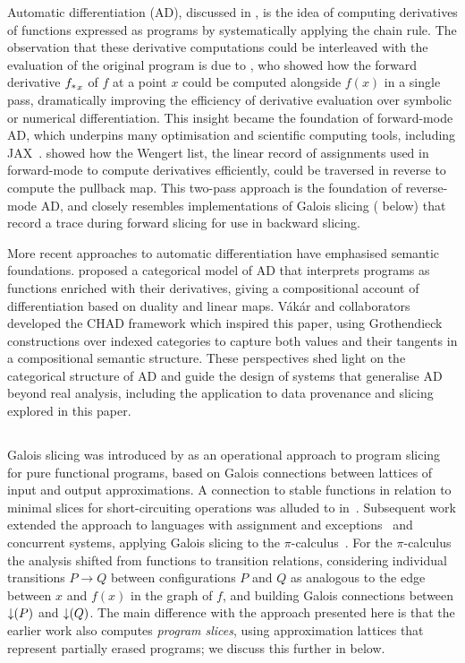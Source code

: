 Automatic differentiation (AD), discussed in , is the idea of computing
derivatives of functions expressed as programs by systematically applying the chain rule. The observation that
these derivative computations could be interleaved with the evaluation of the original program is due to
\citet{linnainmaa76}, who showed how the forward derivative ${f_{*}}_x$ of $f$ at a point $x$ could be
computed alongside $f(x)$ in a single pass, dramatically improving the efficiency of derivative evaluation
over symbolic or numerical differentiation. This insight became the foundation of forward-mode AD, which
underpins many optimisation and scientific computing tools, including JAX~\cite{jax2018github}.
\citet{griewank89} showed how the Wengert list, the linear record of assignments used in forward-mode to
compute derivatives efficiently, could be traversed in reverse to compute the pullback map. This two-pass
approach is the foundation of reverse-mode AD, and closely resembles implementations of Galois slicing
( below) that record a trace during forward slicing for use in backward
slicing.

More recent approaches to automatic differentiation have emphasised semantic foundations. \citet{elliott18}
proposed a categorical model of AD that interprets programs as functions enriched with their derivatives,
giving a compositional account of differentiation based on duality and linear maps. Vákár and
collaborators~\cite{vákár22,nunes2023} developed the CHAD framework which inspired this paper, using
Grothendieck constructions over indexed categories to capture both values and their tangents in a
compositional semantic structure. These perspectives shed light on the categorical structure of AD and guide
the design of systems that generalise AD beyond real analysis, including the application to data provenance
and slicing explored in this paper.

\subsection{\GPS}
\label{sec:related-work:galois-slicing}

Galois slicing was introduced by \citet{perera12a} as an operational approach to program slicing for pure
functional programs, based on Galois connections between lattices of input and output approximations. A
connection to stable functions in relation to minimal slices for short-circuiting operations was alluded to
in~\citet{perera13}. Subsequent work extended the approach to languages with assignment and
exceptions~\cite{ricciotti17} and concurrent systems, applying Galois slicing to the
$\pi$-calculus~\cite{perera16d}. For the $\pi$-calculus the analysis shifted from functions to transition
relations, considering individual transitions $P \longrightarrow Q$ between configurations $P$ and $Q$ as
analogous to the edge between $x$ and $f(x)$ in the graph of $f$, and building Galois connections between
$\mathop{\downarrow}(P)$ and $\mathop{\downarrow}(Q)$. The main difference with the approach presented here is that the earlier work
also computes \emph{program slices}, using approximation lattices that represent partially erased programs; we
discuss this further in  below.

